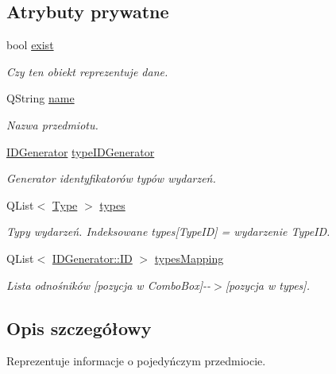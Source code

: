 \subsection*{Atrybuty prywatne}
\begin{DoxyCompactItemize}
\item 
bool \hyperlink{classSubject_a94220ae4e81cef6a54b3ad00c5189213}{exist}
\begin{DoxyCompactList}\small\item\em Czy ten obiekt reprezentuje dane. \item\end{DoxyCompactList}\item 
QString \hyperlink{classSubject_a816225e2744f102877f713f3123a6ba4}{name}
\begin{DoxyCompactList}\small\item\em Nazwa przedmiotu. \item\end{DoxyCompactList}\item 
\hyperlink{classIDGenerator}{IDGenerator} \hyperlink{classSubject_aab207d1dd2076df8de622c54d80fd8cd}{typeIDGenerator}
\begin{DoxyCompactList}\small\item\em Generator identyfikatorów typów wydarzeń. \item\end{DoxyCompactList}\item 
QList$<$ \hyperlink{classType}{Type} $>$ \hyperlink{classSubject_a05041c1516b065f1fb5f2c74c731a0a7}{types}
\begin{DoxyCompactList}\small\item\em Typy wydarzeń. Indeksowane types\mbox{[}TypeID\mbox{]} = wydarzenie TypeID. \item\end{DoxyCompactList}\item 
QList$<$ \hyperlink{classIDGenerator_1_1ID}{IDGenerator::ID} $>$ \hyperlink{classSubject_a986e6137767b698f8bdef30f24c32178}{typesMapping}
\begin{DoxyCompactList}\small\item\em Lista odnośników \mbox{[}pozycja w ComboBox\mbox{]}-\/-\/$>$\mbox{[}pozycja w types\mbox{]}. \item\end{DoxyCompactList}\end{DoxyCompactItemize}


\subsection{Opis szczegółowy}
Reprezentuje informacje o pojedyńczym przedmiocie. 

